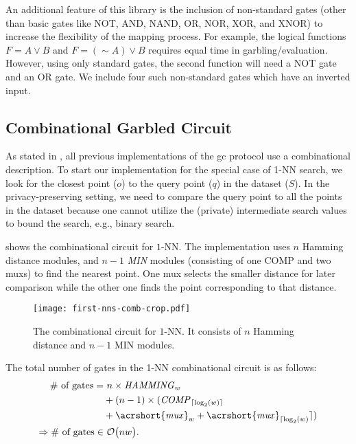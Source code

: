 An additional feature of this library is the inclusion of non-standard gates (other than basic gates like NOT, AND, NAND, OR, NOR, XOR, and XNOR) to increase the flexibility of the mapping process.
For example, the logical functions $F = A\vee B$ and $F = (\sim A)\vee B$ requires equal time in garbling/evaluation.
However, using only standard gates, the second function will need a NOT gate and an OR gate.
We include four such non-standard gates which have an inverted input.

\subsection{Combinational Garbled Circuit}\label{ssec:knn-combgc}
As stated in , all previous implementations of the \acrshort{gc} protocol use a combinational description.
To start our implementation for the special case of 1-NN search, we look for the closest point ($o$) to the query point ($q$) in the dataset ($S$).
In the privacy-preserving setting, we need to compare the query point to all the points in the dataset because one cannot utilize the (private) intermediate search values to bound the search, e.g., binary search.

 shows the combinational circuit for $1$-NN.
The implementation uses $n$ Hamming distance modules, and $n-1$ \emph{MIN} modules (consisting of one COMP and two \acrshort{mux}s) to find the nearest point.
One \acrshort{mux} selects the smaller distance for later comparison while the other one finds the point corresponding to that distance.

\begin{figure}
\centering
\texttt{[image: first-nns-comb-crop.pdf]}
\caption{The combinational circuit for $1$-NN.
It consists of $n$ Hamming distance and $n-1$ MIN modules.}
\label{fig:fist-nns-comb}
\end{figure}

The total number of gates in the 1-NN combinational circuit is as follows:
\begin{align*}
\text{\# of gates} =& ~	n \times \mathit{HAMMING}_{w}\\
					& + (n-1) \times (\mathit{COMP}_{\lceil \log _2(w) \rceil} \\
					& + \mathit{\acrshort{mux}}_w + \mathit{\acrshort{mux}}_{\lceil \log _2(w)} \rceil)\\
\Rightarrow \text{\# of gates} \in & ~\BigO{nw}.
\end{align*}

